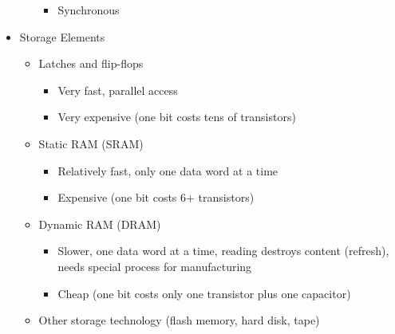 \begin{itemize}
\begin{itemize}
\begin{itemize}
          \item Synchronous

        \end{itemize}

    \end{itemize}

  \item Storage Elements

    \begin{itemize}

      \item Latches and flip-flops

        \begin{itemize}

          \item Very fast, parallel access

          \item Very expensive (one bit costs tens of transistors)

        \end{itemize}

      \item Static RAM (SRAM)

        \begin{itemize}

          \item Relatively fast, only one data word at a time

          \item Expensive (one bit costs 6+ transistors)

        \end{itemize}

      \item Dynamic RAM (DRAM)

        \begin{itemize}

          \item Slower, one data word at a time, reading destroys content (refresh), needs special process for manufacturing

          \item Cheap (one bit costs only one transistor plus one capacitor)

        \end{itemize}

      \item Other storage technology (flash memory, hard disk, tape)

        \begin{itemize}


\end{itemize}
\end{itemize}
\end{itemize}

